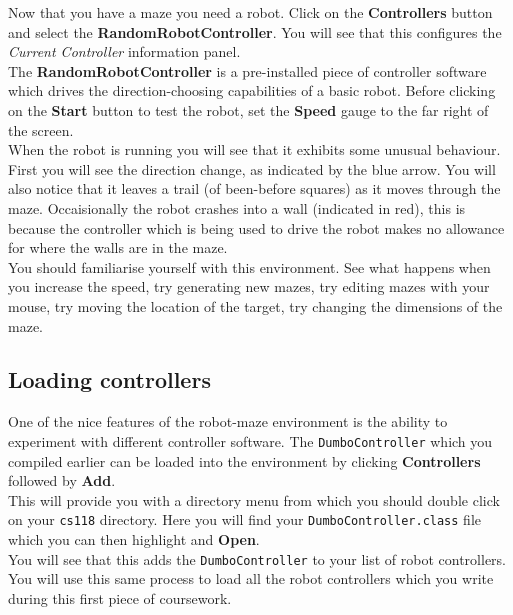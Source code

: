 \noindent
Now that you have a maze you need a robot. Click on the {\bf Controllers} 
button
and select the {\bf RandomRobotController}. You will see that this configures
the {\em Current Controller} information panel. \\

\noindent
The {\bf RandomRobotController} is a pre-installed piece of controller 
software which drives the direction-choosing capabilities of a basic robot. 
Before clicking on the {\bf Start} button to test the robot, set the 
{\bf Speed} gauge to the far right of the screen. \\

\noindent
When the robot is running you will see that it exhibits some unusual behaviour.
First you will see the direction change, as indicated by the blue arrow. You 
will also notice that it leaves a trail (of been-before squares) as it moves 
through the maze. Occaisionally the robot crashes into a wall 
(indicated in red), this is because the 
controller which is being used to drive the robot makes no allowance for 
where the walls are in the maze. \\

\noindent
You should familiarise yourself with this environment. See what happens 
when you increase the speed, try generating new mazes, try editing mazes 
with your mouse, try moving the location of the target, 
try changing the dimensions of the maze.

\subsection{Loading controllers}

One of the nice features of the robot-maze environment is 
the ability to experiment with different controller software. The 
{\tt DumboController} which you compiled earlier can be loaded into the 
environment by clicking {\bf Controllers} followed by {\bf Add}.\\

\noindent
This will provide you with a directory menu from which you should double 
click on your {\tt cs118} directory. Here you will find your 
{\tt DumboController.class} file which you can then highlight and {\bf Open}.\\

\noindent
You will see that this adds the {\tt DumboController} to your list of robot
controllers. You will use this same process to load all the robot controllers
which you write during this first piece of coursework.\\

